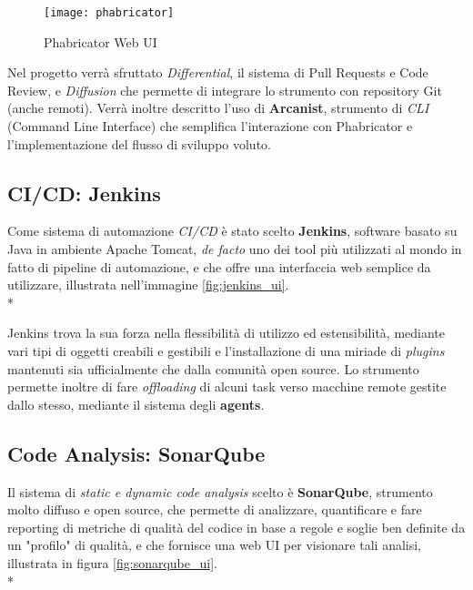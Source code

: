 \documentclass[../main.tex]{subfiles}
\begin{document}
    	        \begin{figure}[H]
        			\centering
        			\texttt{[image: phabricator]}
        			\caption{Phabricator Web UI}
        			\label{fig:phabricator}
    	        \end{figure}
    	        
    	        Nel progetto verrà sfruttato \emph{Differential}, il sistema di Pull Requests e Code Review, e \emph{Diffusion} che permette di integrare lo strumento con repository Git (anche remoti). Verrà inoltre descritto l'uso di \textbf{Arcanist}, strumento di \emph{CLI} (Command Line Interface) che semplifica l'interazione con Phabricator e l'implementazione del flusso di sviluppo voluto.
    	
        	\subsection{CI/CD: Jenkins}
        	
        	    Come sistema di automazione \emph{CI/CD} è stato scelto \textbf{Jenkins}\cite{jenkins}, software basato su Java in ambiente Apache Tomcat, \emph{de facto} uno dei tool più utilizzati al mondo in fatto di pipeline di automazione, e che offre una interfaccia web semplice da utilizzare,  illustrata nell'immagine \ref{fig:jenkins_ui}.\\*
        	    
        	    Jenkins trova la sua forza nella flessibilità di utilizzo ed estensibilità, mediante vari tipi di oggetti creabili e gestibili e l'installazione di una miriade di \emph{plugins} mantenuti sia ufficialmente che dalla comunità open source. Lo strumento permette inoltre di fare \emph{offloading} di alcuni task verso macchine remote gestite dallo stesso, mediante il sistema degli \textbf{agents}.
    	
    	    \subsection{Code Analysis: SonarQube}
    	    
    	        Il sistema di \emph{static e dynamic code analysis} scelto è \textbf{SonarQube}, strumento molto diffuso e open source, che permette di analizzare, quantificare e fare reporting di metriche di qualità del codice in base a regole e soglie ben definite da un "profilo" di qualità, e che fornisce una web UI per visionare tali analisi, illustrata in figura \ref{fig:sonarqube_ui}.\\*
    	        
\end{document}
